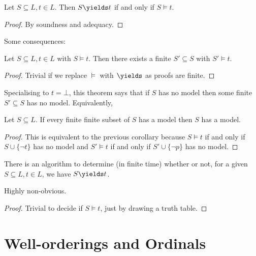 \documentclass[a4paper]{article}
\begin{document}
\begin{theorem}
  Let \(S \subseteq L, t \in L\). Then \(S \yields t\) if and only if \(S \models t\).
\end{theorem}

\begin{proof}
  By soundness and adequacy.
\end{proof}

Some consequences:

\begin{corollary}
  Let \(S \subseteq L, t \in L\) with \(S \models t\). Then there exists a finite \(S' \subseteq S\) with \(S' \models t\).
\end{corollary}

\begin{proof}
  Trivial if we replace \(\models\) with \(\yields\) as proofs are finite.
\end{proof}

Specialising to \(t = \bot\), this theorem says that if \(S\) has no model then some finite \(S' \subseteq S\) has no model. Equivalently,

\begin{corollary}
  Let \(S \subseteq L\). If every finite finite subset of \(S\) has a model then \(S\) has a model.
\end{corollary}

\begin{proof}
  This is equivalent to the previous corollary because \(S \models t\) if and only if \(S \cup \{\neg t\}\) has no model and \(S' \models t\) if and only if \(S' \cup \{\neg p\}\) has no model.
\end{proof}

\begin{corollary}
  There is an algorithm to determine (in finite time) whether or not, for a given \(S \subseteq L, t\in L\), we have \(S \yields t\).
\end{corollary}

\begin{remark}
  Highly non-obvious.
\end{remark}

\begin{proof}
  Trivial to decide if \(S \models t\), just by drawing a truth table.
\end{proof}

\section{Well-orderings and Ordinals}
\end{document}
